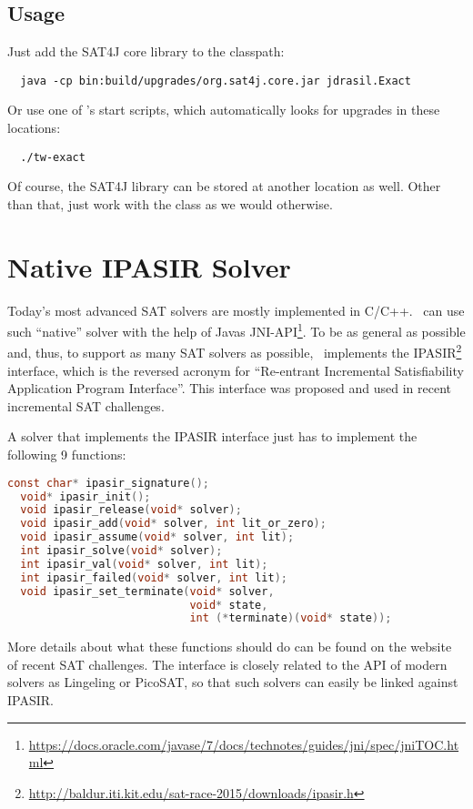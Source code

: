 \documentclass[a4paper, ukenglish, twoside, openright]{jdrasilmanual}
\begin{document}
\subsection{Usage}
Just add the SAT4J core library to the classpath:
\begin{lstlisting}
  java -cp bin:build/upgrades/org.sat4j.core.jar jdrasil.Exact
\end{lstlisting}
Or use one of \Jdrasil's start scripts, which automatically looks for
upgrades in these locations:
\begin{lstlisting}
  ./tw-exact
\end{lstlisting}
Of course, the SAT4J library can be stored at another location as
well. Other than that, just work with the class 
as we would otherwise.

\section{Native IPASIR Solver}

Today's most advanced SAT solvers are mostly implemented in
C/C++. \Jdrasil\ can use such ``native'' solver with the help of Javas
JNI-API\footnote{\url{https://docs.oracle.com/javase/7/docs/technotes/guides/jni/spec/jniTOC.html}}. 
To be as general as possible and, thus, to support as many SAT solvers
as possible, \Jdrasil\ implements the
IPASIR\footnote{\url{http://baldur.iti.kit.edu/sat-race-2015/downloads/ipasir.h}}
interface, which is the reversed acronym for ``Re-entrant Incremental
Satisfiability Application Program Interface''. This interface was
proposed and used in recent incremental SAT challenges. 

A solver that implements the IPASIR interface just has to implement
the following 9 functions:
\begin{lstlisting}[language=c]
  const char* ipasir_signature();
  void* ipasir_init();
  void ipasir_release(void* solver);
  void ipasir_add(void* solver, int lit_or_zero);
  void ipasir_assume(void* solver, int lit);
  int ipasir_solve(void* solver);
  int ipasir_val(void* solver, int lit);
  int ipasir_failed(void* solver, int lit);
  void ipasir_set_terminate(void* solver, 
                            void* state, 
                            int (*terminate)(void* state));
\end{lstlisting}
More details about what these functions should do can be found on the
website of recent SAT challenges. The interface is closely related to
the API of modern solvers as Lingeling or PicoSAT, so that such
solvers can easily be linked against IPASIR.
\end{document}
